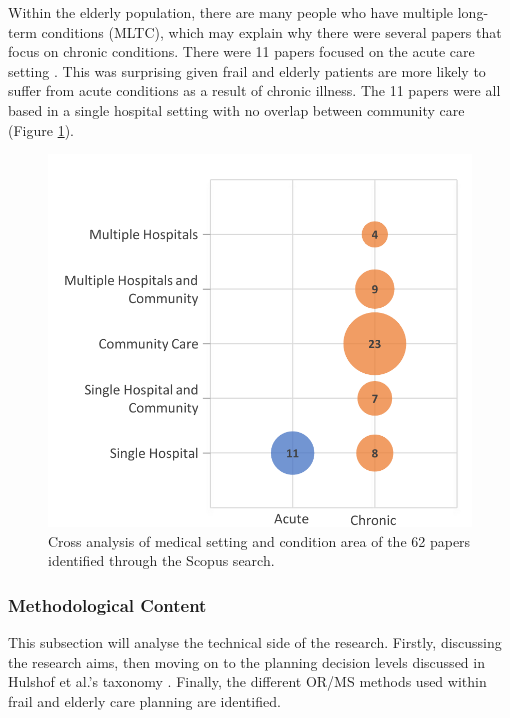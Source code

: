 \documentclass[../thesis.tex]{subfiles}
\begin{document}
Within the elderly population, there are many people who have multiple long-term conditions (MLTC), which may explain why there were several papers that focus on chronic conditions. There were 11 papers focused on the acute care setting \cite{Abe, Azad, Franklin, Kul, Onggo, Rashwan, Rossille, Shaw, Silvester, Trevisan, Wallace}. 
This was surprising given frail and elderly patients are more likely to suffer from acute conditions as a result of chronic illness.
The 11 papers were all based in a single hospital setting with no overlap between community care (Figure \ref{fig:HospCondition}).

\begin{figure}[H]
\centering
  \includegraphics[scale =0.6]{Chapter2/Figures/HospitalCondition1.pdf}
\caption{Cross analysis of medical setting and condition area of the 62 papers identified through the Scopus search.}
\label{fig:HospCondition}  
\end{figure} 



\subsubsection{Methodological Content}
This subsection will analyse the technical side of the research. Firstly, discussing the research aims, then moving on to the planning decision levels discussed in Hulshof et al.'s taxonomy \cite{PHulshof}. Finally, the different OR/MS methods used within frail and elderly care planning are identified.
\end{document}
